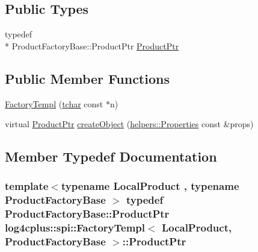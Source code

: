 \subsection*{Public Types}
\begin{DoxyCompactItemize}
\item 
typedef \\*
Product\-Factory\-Base\-::\-Product\-Ptr \hyperlink{classlog4cplus_1_1spi_1_1FactoryTempl_a6cc639c261833a07c94a70bdf55dda8b}{Product\-Ptr}
\end{DoxyCompactItemize}
\subsection*{Public Member Functions}
\begin{DoxyCompactItemize}
\item 
\hyperlink{classlog4cplus_1_1spi_1_1FactoryTempl_a44cfba1fd8f67cafe99ab3ab76316c78}{Factory\-Templ} (\hyperlink{namespacelog4cplus_a7b80b5711ae9e7a1ddd97dbaefbe3583}{tchar} const $\ast$n)
\item 
virtual \hyperlink{classlog4cplus_1_1spi_1_1FactoryTempl_a6cc639c261833a07c94a70bdf55dda8b}{Product\-Ptr} \hyperlink{classlog4cplus_1_1spi_1_1FactoryTempl_ade742fdb706a16f1799ce1a045042dcb}{create\-Object} (\hyperlink{classlog4cplus_1_1helpers_1_1Properties}{helpers\-::\-Properties} const \&props)
\end{DoxyCompactItemize}


\subsection{Member Typedef Documentation}
\hypertarget{classlog4cplus_1_1spi_1_1FactoryTempl_a6cc639c261833a07c94a70bdf55dda8b}{
\subsubsection[{Product\-Ptr}]{\setlength{\rightskip}{0pt plus 5cm}template$<$typename Local\-Product , typename Product\-Factory\-Base $>$ typedef Product\-Factory\-Base\-::\-Product\-Ptr {\bf log4cplus\-::spi\-::\-Factory\-Templ}$<$ Local\-Product, Product\-Factory\-Base $>$\-::{\bf Product\-Ptr}}}\label{classlog4cplus_1_1spi_1_1FactoryTempl_a6cc639c261833a07c94a70bdf55dda8b}


